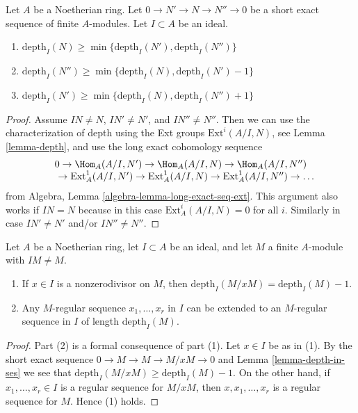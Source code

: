 \begin{lemma}
\label{lemma-depth-in-ses}
Let $A$ be a Noetherian ring. Let $0 \to N' \to N \to N'' \to 0$
be a short exact sequence of finite $A$-modules.
Let $I \subset A$ be an ideal.
\begin{enumerate}
\item
$\text{depth}_I(N) \geq \min\{\text{depth}_I(N'), \text{depth}_I(N'')\}$
\item
$\text{depth}_I(N'') \geq \min\{\text{depth}_I(N), \text{depth}_I(N') - 1\}$
\item
$\text{depth}_I(N') \geq \min\{\text{depth}_I(N), \text{depth}_I(N'') + 1\}$
\end{enumerate}
\end{lemma}

\begin{proof}
Assume $IN \not = N$, $IN' \not = N'$, and $IN'' \not = N''$. Then we
can use the characterization of depth using the Ext groups
$\text{Ext}^i(A/I, N)$, see Lemma \ref{lemma-depth},
and use the long exact cohomology sequence
$$
\begin{matrix}
0
\to \Hom_A(A/I, N')
\to \Hom_A(A/I, N)
\to \Hom_A(A/I, N'')
\\
\phantom{0\ }
\to \text{Ext}^1_A(A/I, N')
\to \text{Ext}^1_A(A/I, N)
\to \text{Ext}^1_A(A/I, N'')
\to \ldots
\end{matrix}
$$
from Algebra, Lemma \ref{algebra-lemma-long-exact-seq-ext}.
This argument also works if $IN = N$
because in this case $\text{Ext}^i_A(A/I, N) = 0$ for all $i$.
Similarly in case $IN' \not = N'$ and/or $IN'' \not = N''$.
\end{proof}

\begin{lemma}
\label{lemma-depth-drops-by-one}
Let $A$ be a Noetherian ring, let $I \subset A$ be an ideal, and
let $M$ a finite $A$-module with $IM \not = M$.
\begin{enumerate}
\item If $x \in I$ is a nonzerodivisor on $M$, then
$\text{depth}_I(M/xM) = \text{depth}_I(M) - 1$.
\item Any $M$-regular sequence $x_1, \ldots, x_r$ in $I$ can be extended to an
$M$-regular sequence in $I$ of length $\text{depth}_I(M)$.
\end{enumerate}
\end{lemma}

\begin{proof}
Part (2) is a formal consequence of part (1). Let $x \in I$ be as in (1).
By the short exact sequence $0 \to M \to M \to M/xM \to 0$ and
Lemma \ref{lemma-depth-in-ses} we see that
$\text{depth}_I(M/xM) \geq \text{depth}_I(M) - 1$.
On the other hand, if $x_1, \ldots, x_r \in I$
is a regular sequence for $M/xM$, then $x, x_1, \ldots, x_r$
is a regular sequence for $M$. Hence (1) holds.
\end{proof}


